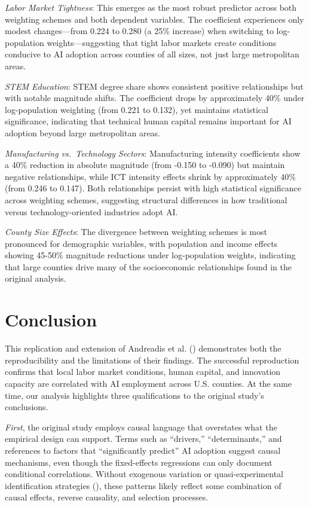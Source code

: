 \documentclass[
]{article}
\begin{document}
\emph{Labor Market Tightness}: This emerges as the most robust predictor
across both weighting schemes and both dependent variables. The
coefficient experiences only modest changes---from 0.224 to 0.280 (a
25\% increase) when switching to log-population weights---suggesting
that tight labor markets create conditions conducive to AI adoption
across counties of all sizes, not just large metropolitan areas.

\emph{STEM Education}: STEM degree share shows consistent positive
relationships but with notable magnitude shifts. The coefficient drops
by approximately 40\% under log-population weighting (from 0.221 to
0.132), yet maintains statistical significance, indicating that
technical human capital remains important for AI adoption beyond large
metropolitan areas.

\emph{Manufacturing vs.~Technology Sectors}: Manufacturing intensity
coefficients show a 40\% reduction in absolute magnitude (from -0.150 to
-0.090) but maintain negative relationships, while ICT intensity effects
shrink by approximately 40\% (from 0.246 to 0.147). Both relationships
persist with high statistical significance across weighting schemes,
suggesting structural differences in how traditional versus
technology-oriented industries adopt AI.

\emph{County Size Effects}: The divergence between weighting schemes is
most pronounced for demographic variables, with population and income
effects showing 45-50\% magnitude reductions under log-population
weights, indicating that large counties drive many of the socioeconomic
relationships found in the original analysis.

\section{Conclusion}\label{conclusion}

This replication and extension of Andreadis et al.
() demonstrates both the
reproducibility and the limitations of their findings. The successful
reproduction confirms that local labor market conditions, human capital,
and innovation capacity are correlated with AI employment across U.S.
counties. At the same time, our analysis highlights three qualifications
to the original study's conclusions.

\emph{First}, the original study employs causal language that overstates
what the empirical design can support. Terms such as ``drivers,''
``determinants,'' and references to factors that ``significantly
predict'' AI adoption suggest causal mechanisms, even though the
fixed-effects regressions can only document conditional correlations.
Without exogenous variation or quasi-experimental identification
strategies (), these patterns
likely reflect some combination of causal effects, reverse causality,
and selection processes.
\end{document}
